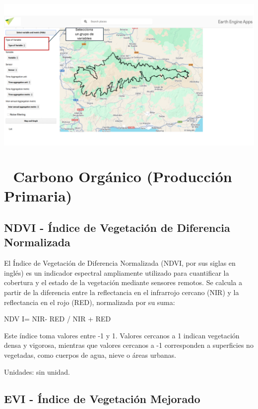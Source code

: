 \documentclass[
]{book}
\begin{document}
\includegraphics{assets/variables_es.png}

\section{\texorpdfstring{\textbf{🌱 Carbono Orgánico (Producción Primaria)}}{🌱 Carbono Orgánico (Producción Primaria)}}\label{carbono-orguxe1nico-producciuxf3n-primaria-1}

\subsection{\texorpdfstring{\textbf{NDVI} - Índice de Vegetación de Diferencia Normalizada}{NDVI - Índice de Vegetación de Diferencia Normalizada}}\label{ndvi---uxedndice-de-vegetaciuxf3n-de-diferencia-normalizada-1}

El Índice de Vegetación de Diferencia Normalizada (NDVI, por sus siglas en inglés) es un indicador espectral ampliamente utilizado para cuantificar la cobertura y el estado de la vegetación mediante sensores remotos. Se calcula a partir de la diferencia entre la reflectancia en el infrarrojo cercano (NIR) y la reflectancia en el rojo (RED), normalizada por su suma:

NDV I= NIR- RED / NIR + RED

Este índice toma valores entre -1 y 1. Valores cercanos a 1 indican vegetación densa y vigorosa, mientras que valores cercanos a -1 corresponden a superficies no vegetadas, como cuerpos de agua, nieve o áreas urbanas.

Unidades: sin unidad.

\subsection{\texorpdfstring{\textbf{EVI} - Índice de Vegetación Mejorado}{EVI - Índice de Vegetación Mejorado}}\label{evi---uxedndice-de-vegetaciuxf3n-mejorado-1}
\end{document}
